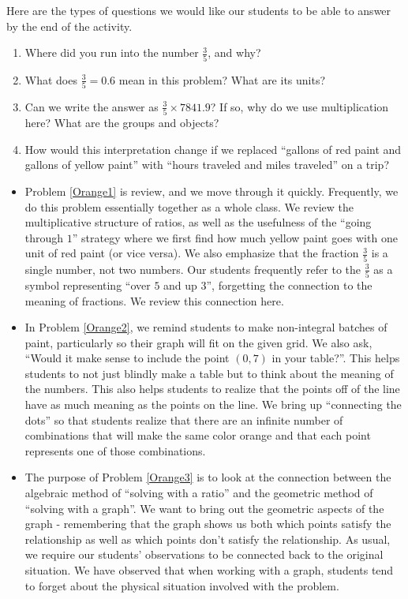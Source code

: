 \documentclass{ximera}
\begin{document}
\begin{instructorNotes}
Here are the types of questions we would like our students to be able to answer by the end of the activity.
\begin{enumerate}
    \item Where did you run into the number $\frac35$, and why?      
    \item What does $\frac35 = 0.6$ mean in this problem?  What are its units?     
    \item Can we write the answer as $\frac35 \times 7841.9$? If so, why do we use multiplication here?  What are the groups and objects?  
    \item How would this interpretation change if we replaced ``gallons of red paint and gallons of yellow paint'' with ``hours traveled and miles traveled'' on a trip?
\end{enumerate}
\begin{itemize}
    \item Problem \ref{Orange1} is review, and we move through it quickly.  Frequently, we do this problem essentially together as a whole class.  We review the multiplicative structure of ratios, as well as the usefulness of the ``going through $1$'' strategy where we first find how much yellow paint goes with one unit of red paint (or vice versa).  We also emphasize that the fraction $\frac{3}{5}$ is a single number, not two numbers.  Our students frequently refer to the $\frac{3}{5}$ as a symbol representing ``over $5$ and up $3$'', forgetting the connection to the meaning of fractions.  We review this connection here.
    \item In Problem \ref{Orange2}, we remind students to make non-integral batches of paint, particularly so their graph will fit on the given grid.  We also ask, ``Would it make sense to include the point $(0,7)$ in your table?''.  This helps students to not just blindly make a table but to think about the meaning of the numbers.  This also helps students to realize that the points off of the line have as much meaning as the points on the line.  We bring up ``connecting the dots'' so that students realize that there are an infinite number of combinations that will make the same color orange and that each point represents one of those combinations.
    \item The purpose of Problem \ref{Orange3} is to look at the connection between the algebraic method of ``solving with a ratio'' and the geometric method of ``solving with a graph''.  We want to bring out the geometric aspects of the graph - remembering that the graph shows us both which points satisfy the relationship as well as which points don't satisfy the relationship.  As usual, we require our students' observations to be connected back to the original situation.  We have observed that when working with a graph, students tend to forget about the physical situation involved with the problem.

\end{itemize}
\end{instructorNotes}
\end{document}

